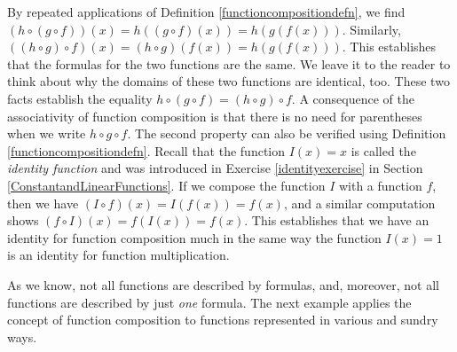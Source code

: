 \medskip

By repeated applications of Definition \ref{functioncompositiondefn}, we find  $(h \circ (g \circ f))(x) = h((g \circ f)(x)) = h(g(f(x)))$.  Similarly, $((h \circ g) \circ f)(x) = (h \circ g)(f(x)) = h(g(f(x)))$.  This establishes that the formulas for the two functions are the same.  We leave it to the reader to think about why the domains of these two functions are identical, too.  These two facts establish the equality $h \circ (g \circ f) = (h \circ g) \circ f$.  A consequence of the associativity of function composition is that there is no need for parentheses when we write $h \circ g \circ f$. The second property can also be verified using Definition \ref{functioncompositiondefn}.  Recall that the function $I(x) = x$ is called the  \textit{identity function} and was introduced in Exercise  \ref{identityexercise} in Section \ref{ConstantandLinearFunctions}.  If we compose the function $I$ with a function $f$, then we have $(I \circ f)(x) = I(f(x)) = f(x)$, and a similar computation shows $(f\circ I)(x) = f(I(x)) = f(x)$. This establishes that we have an identity for function composition much in the same way the function $I(x) = 1$ is an identity for function multiplication. 

As we know, not all functions are described by formulas, and, moreover, not all functions are described by just \textit{one} formula.  The next example applies the concept of function composition to functions represented in various and sundry ways.


